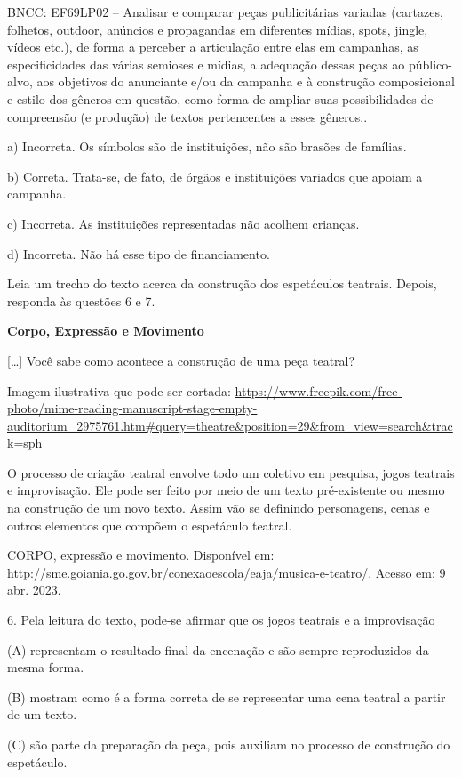 \begin{itemize}
\begin{itemize}
{\begin{itemize}
\begin{itemize}
\begin{escolha}
\begin{escolha}
\begin{escolha}
\begin{escolha}
\begin{escolha}
BNCC: EF69LP02 -- Analisar e comparar peças publicitárias variadas
(cartazes, folhetos, outdoor, anúncios e propagandas em diferentes
mídias, spots, jingle, vídeos etc.), de forma a perceber a articulação
entre elas em campanhas, as especificidades das várias semioses e
mídias, a adequação dessas peças ao público-alvo, aos objetivos do
anunciante e/ou da campanha e à construção composicional e estilo dos
gêneros em questão, como forma de ampliar suas possibilidades de
compreensão (e produção) de textos pertencentes a esses gêneros..

a) Incorreta. Os símbolos são de instituições, não são brasões de
famílias.

b) Correta. Trata-se, de fato, de órgãos e instituições variados que
apoiam a campanha.

c) Incorreta. As instituições representadas não acolhem crianças.

d) Incorreta. Não há esse tipo de financiamento.

Leia um trecho do texto acerca da construção dos espetáculos teatrais.
Depois, responda às questões 6 e 7.

\textbf{Corpo, Expressão e Movimento}

{[}\ldots{}{]} Você sabe como acontece a construção de uma peça teatral?

Imagem ilustrativa que pode ser cortada:
\url{https://www.freepik.com/free-photo/mime-reading-manuscript-stage-empty-auditorium_2975761.htm\#query=theatre\&position=29\&from_view=search\&track=sph}

O processo de criação teatral envolve todo um coletivo em pesquisa,
jogos teatrais e improvisação. Ele pode ser feito por meio de um texto
pré-existente ou mesmo na construção de um novo texto. Assim vão se
definindo personagens, cenas e outros elementos que compõem o espetáculo
teatral.

CORPO, expressão e movimento. Disponível em:
http://sme.goiania.go.gov.br/conexaoescola/eaja/musica-e-teatro/. Acesso
em: 9 abr. 2023.

6. Pela leitura do texto, pode-se afirmar que os jogos teatrais e a
improvisação

(A) representam o resultado final da encenação e são sempre reproduzidos
da mesma forma.

(B) mostram como é a forma correta de se representar uma cena teatral a
partir de um texto.

(C) são parte da preparação da peça, pois auxiliam no processo de
construção do espetáculo.


\end{escolha}
\end{escolha}
\end{escolha}
\end{escolha}
\end{escolha}
\end{itemize}
\end{itemize}}
\end{itemize}
\end{itemize}
